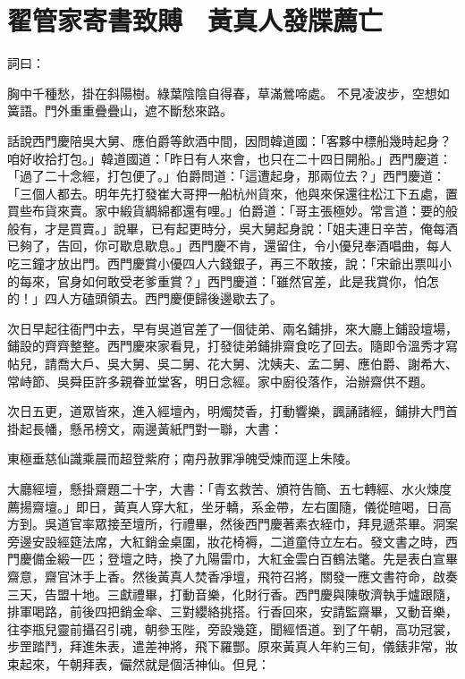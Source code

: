 %

\chapter{翟管家寄書致賻　黃真人發牒薦亡}

詞曰：

胸中千種愁，掛在斜陽樹。綠葉陰陰自得春，草滿鶯啼處。
不見凌波步，空想如簧語。門外重重疊疊山，遮不斷愁來路。

話說西門慶陪吳大舅、應伯爵等飲酒中間，因問韓道國：「客夥中標船幾時起身？咱好收拾打包。」韓道國道：「昨日有人來會，也只在二十四日開船。」西門慶道：「過了二十念經，打包便了。」伯爵問道：「這遭起身，那兩位去？」西門慶道：「三個人都去。明年先打發崔大哥押一船杭州貨來，他與來保還往松江下五處，置買些布貨來賣。家中緞貨綢綿都還有哩。」伯爵道：「哥主張極妙。常言道：要的般般有，才是買賣。」說畢，已有起更時分，吳大舅起身說：「姐夫連日辛苦，俺每酒已夠了，告回，你可歇息歇息。」西門慶不肯，還留住，令小優兒奉酒唱曲，每人吃三鐘才放出門。西門慶賞小優四人六錢銀子，再三不敢接，說：「宋爺出票叫小的每來，官身如何敢受老爹重賞？」西門慶道：「雖然官差，此是我賞你，怕怎的！」四人方磕頭領去。西門慶便歸後邊歇去了。

次日早起往衙門中去，早有吳道官差了一個徒弟、兩名鋪排，來大廳上鋪設壇場，鋪設的齊齊整整。西門慶來家看見，打發徒弟鋪排齋食吃了回去。隨即令溫秀才寫帖兒，請喬大戶、吳大舅、吳二舅、花大舅、沈姨夫、孟二舅、應伯爵、謝希大、常峙節、吳舜臣許多親眷並堂客，明日念經。家中廚役落作，治辦齋供不題。

次日五更，道眾皆來，進入經壇內，明燭焚香，打動響樂，諷誦諸經，鋪排大門首掛起長幡，懸吊榜文，兩邊黃紙門對一聯，大書：

東極垂慈仙識乘晨而超登紫府；南丹赦罪凈魄受煉而逕上朱陵。

大廳經壇，懸掛齋題二十字，大書：「青玄救苦、頒符告簡、五七轉經、水火煉度薦揚齋壇。」即日，黃真人穿大紅，坐牙轎，系金帶，左右圍隨，儀從暄喝，日高方到。吳道官率眾接至壇所，行禮畢，然後西門慶著素衣絰巾，拜見遞茶畢。洞案旁邊安設經筵法席，大紅銷金桌圍，妝花椅褥，二道童侍立左右。發文書之時，西門慶備金緞一匹；登壇之時，換了九陽雷巾，大紅金雲白百鶴法氅。先是表白宣畢齋意，齋官沐手上香。然後黃真人焚香凈壇，飛符召將，關發一應文書符命，啟奏三天，告盟十地。三獻禮畢，打動音樂，化財行香。西門慶與陳敬濟執手爐跟隨，排軍喝路，前後四把銷金傘、三對纓絡挑搭。行香回來，安請監齋畢，又動音樂，往李瓶兒靈前攝召引魂，朝參玉陛，旁設幾筵，聞經悟道。到了午朝，高功冠裳，步罡踏鬥，拜進朱表，遣差神將，飛下羅酆。原來黃真人年約三旬，儀錶非常，妝束起來，午朝拜表，儼然就是個活神仙。但見：

